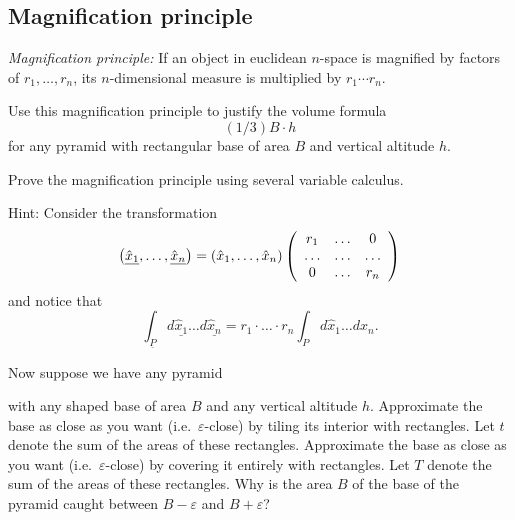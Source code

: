 \subsection*{Magnification principle}

\textit{Magnification principle:} If an object in euclidean $n$-space is
magnified by factors of $r_{1},\ldots,r_{n}$, its $n$-dimensional
measure is multiplied by $r_{1}\cdots r_{n}$.

\begin{exercise}
Use this magnification principle to justify the volume formula%
\[
(1/3)B\cdot h
\]
for any pyramid with rectangular base of area $B$ and vertical altitude $h$.
\end{exercise}

\begin{exercise}
Prove the magnification principle using several variable calculus.

Hint: Consider the transformation%
\[
\left(  \underline{\hat{x}_{1}},\ldots,\underline{\hat{x}_{n}}\right)
=\left(  \hat{x}_{1},\ldots,\hat{x}_{n}\right)  \left(
\begin{array}
[c]{ccc}%
r_{1} & \ldots & 0\\
\ldots & \ldots & \ldots\\
0 & \ldots & r_{n}%
\end{array}
\right)
\]
and notice that%
\[%
{\displaystyle\int\nolimits_{\underline{P}}}
d\underline{\hat{x}_{1}}\ldots d\underline{\hat{x}_{n}}=r_{1}%
\cdot\ldots\cdot r_{n}%
{\displaystyle\int\nolimits_{P}}
d\hat{x}_{1}\ldots d\hat{x}_{n}.
\]

\end{exercise}

Now suppose we have any pyramid%
\begin{image}
\end{image}
with any shaped base of area $B$ and any vertical altitude $h$. Approximate
the base as close as you want (i.e.\ $\varepsilon$-close) by tiling its interior
with rectangles. Let $t$ denote the sum of the areas of these rectangles.
Approximate the base as close as you want (i.e.\ $\varepsilon$-close) by
covering it entirely with rectangles. Let $T$ denote the sum of the areas of
these rectangles. Why is the area $B$ of the base of the pyramid caught
between $B-\varepsilon$ and $B+\varepsilon$?

